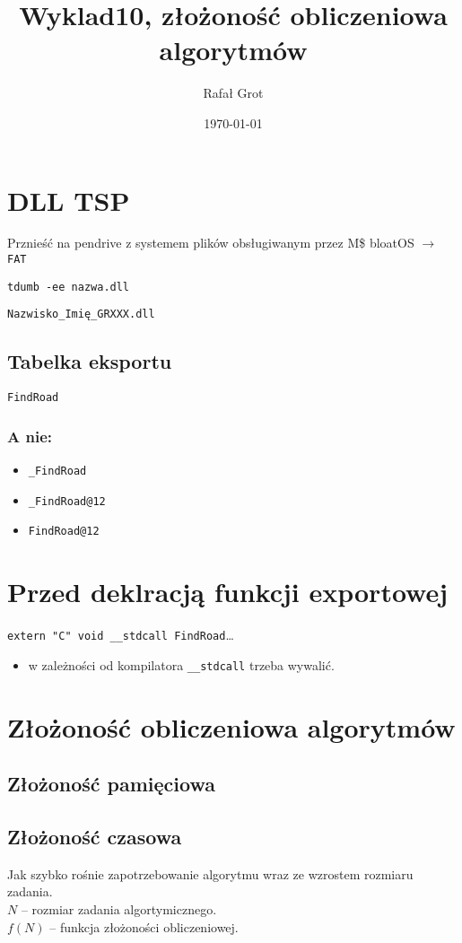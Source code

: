 \documentclass[11pt]{article}
\author{Rafał Grot}
\date{\today}
\title{Wyklad10, złożoność obliczeniowa algorytmów}
\begin{document}
\maketitle
\tableofcontents


\section{DLL TSP}
\label{sec:org61add5c}
Prznieść na pendrive z systemem plików obsługiwanym przez M\$ bloatOS \(\to\) \texttt{FAT}

\texttt{tdumb -ee nazwa.dll}

\texttt{Nazwisko\_Imię\_GRXXX.dll}
\subsection{Tabelka eksportu}
\label{sec:orga3c8f78}
\texttt{FindRoad}

\subsubsection{A nie:}
\label{sec:org13a05e1}
\begin{itemize}
\item \texttt{\_FindRoad}
\item \texttt{\_FindRoad@12}
\item \texttt{FindRoad@12}
\end{itemize}

\section{Przed deklracją funkcji exportowej}
\label{sec:org4045906}
\texttt{extern "C" void \_\_stdcall FindRoad}\ldots{}
\begin{itemize}
\item w zależności od kompilatora \texttt{\_\_stdcall} trzeba wywalić.
\end{itemize}


\section{Złożoność obliczeniowa algorytmów}
\label{sec:orgfb22700}
\subsection{Złożoność pamięciowa}
\label{sec:orgaa3c249}

\subsection{Złożoność czasowa}
\label{sec:orgafd1b5a}
Jak szybko rośnie zapotrzebowanie algorytmu wraz ze wzrostem rozmiaru zadania.\\\empty
\(N\) -- rozmiar zadania algortymicznego.\\\empty
\(f(N)\) -- funkcja złożoności obliczeniowej.
\end{document}
